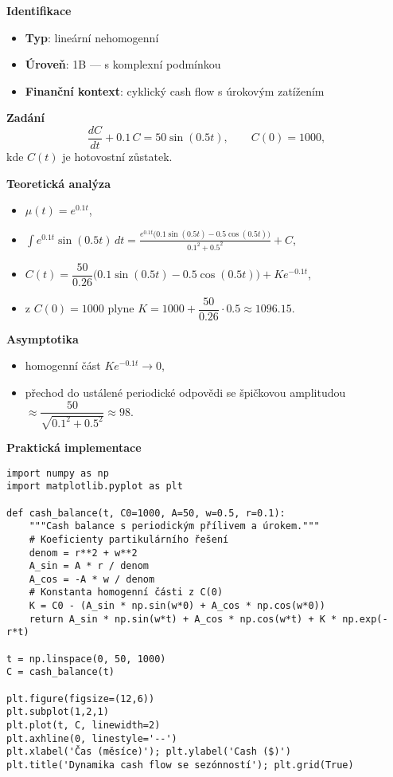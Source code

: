 \begin{example}
\label{ex:1b4}

\textbf{Identifikace}
\begin{itemize}
\item \textbf{Typ}: lineární nehomogenní
\item \textbf{Úroveň}: 1B — s komplexní podmínkou
\item \textbf{Finanční kontext}: cyklický cash flow s úrokovým zatížením
\end{itemize}

\textbf{Zadání}
\[
\frac{dC}{dt} + 0.1\,C = 50\sin(0.5t), \qquad C(0)=1000,
\]
kde $C(t)$ je hotovostní zůstatek.

\textbf{Teoretická analýza}
\begin{itemize}
\item $\mu(t)=e^{0.1 t}$, 
\item $\displaystyle \int e^{0.1t}\sin(0.5t)\,dt=\frac{e^{0.1t}\bigl(0.1\sin(0.5t)-0.5\cos(0.5t)\bigr)}{0.1^2+0.5^2}+C$,
\item $C(t)=\dfrac{50}{0.26}\bigl(0.1\sin(0.5t)-0.5\cos(0.5t)\bigr)+K e^{-0.1t}$,
\item z $C(0)=1000$ plyne $K=1000 + \dfrac{50}{0.26}\cdot 0.5 \approx 1096.15$.
\end{itemize}

\textbf{Asymptotika}
\begin{itemize}
\item homogenní část $K e^{-0.1t}\to 0$,
\item přechod do ustálené periodické odpovědi se špičkovou amplitudou $\approx \dfrac{50}{\sqrt{0.1^2+0.5^2}}\approx 98$.
\end{itemize}

\textbf{Praktická implementace}
\begin{verbatim}
import numpy as np
import matplotlib.pyplot as plt

def cash_balance(t, C0=1000, A=50, w=0.5, r=0.1):
    """Cash balance s periodickým přílivem a úrokem."""
    # Koeficienty partikulárního řešení
    denom = r**2 + w**2
    A_sin = A * r / denom
    A_cos = -A * w / denom
    # Konstanta homogenní části z C(0)
    K = C0 - (A_sin * np.sin(w*0) + A_cos * np.cos(w*0))
    return A_sin * np.sin(w*t) + A_cos * np.cos(w*t) + K * np.exp(-r*t)

t = np.linspace(0, 50, 1000)
C = cash_balance(t)

plt.figure(figsize=(12,6))
plt.subplot(1,2,1)
plt.plot(t, C, linewidth=2)
plt.axhline(0, linestyle='--')
plt.xlabel('Čas (měsíce)'); plt.ylabel('Cash ($)')
plt.title('Dynamika cash flow se sezónností'); plt.grid(True)


\end{verbatim}
\end{example}
